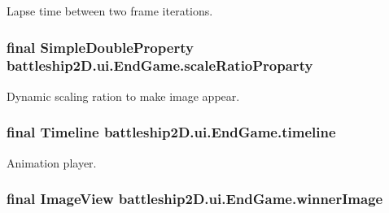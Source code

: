 Lapse time between two frame iterations. 

\hypertarget{classbattleship2D_1_1ui_1_1EndGame_af2356a8563c785f5bf1611d34f400313}{
\subsubsection[{scale\-Ratio\-Proparty}]{\setlength{\rightskip}{0pt plus 5cm}final Simple\-Double\-Property battleship2\-D.\-ui.\-End\-Game.\-scale\-Ratio\-Proparty\hspace{0.3cm}{\ttfamily [private]}}}\label{classbattleship2D_1_1ui_1_1EndGame_af2356a8563c785f5bf1611d34f400313}


Dynamic scaling ration to make image appear. 

\hypertarget{classbattleship2D_1_1ui_1_1EndGame_a7df35309ef96ff6207a7f2825f58ea73}{
\subsubsection[{timeline}]{\setlength{\rightskip}{0pt plus 5cm}final Timeline battleship2\-D.\-ui.\-End\-Game.\-timeline\hspace{0.3cm}{\ttfamily [private]}}}\label{classbattleship2D_1_1ui_1_1EndGame_a7df35309ef96ff6207a7f2825f58ea73}


Animation player. 

\hypertarget{classbattleship2D_1_1ui_1_1EndGame_affa73ecfef0d96061aaeff85da4b208d}{
\subsubsection[{winner\-Image}]{\setlength{\rightskip}{0pt plus 5cm}final Image\-View battleship2\-D.\-ui.\-End\-Game.\-winner\-Image\hspace{0.3cm}{\ttfamily [private]}}}\label{classbattleship2D_1_1ui_1_1EndGame_affa73ecfef0d96061aaeff85da4b208d}


